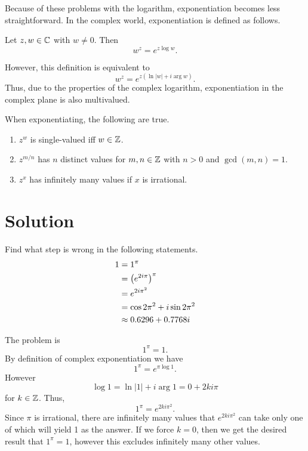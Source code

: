 \documentclass[notitlepage]{problem-solving}
\begin{document}
Because of these problems with the logarithm, exponentiation becomes less straightforward.
In the complex world, exponentiation is defined as follows.
\begin{definition}
	Let $z,w\in\mathbb{C}$ with $w\neq 0$.
	Then
	\[
		w^z = e^{z\log w}.
	\]
\end{definition}
However, this definition is equivalent to
\[
	w^z = e^{z(\ln|w| + i\arg w)}.
\]
Thus, due to the properties of the complex logarithm, exponentiation in the complex plane is also multivalued.

When exponentiating, the following are true.
\begin{enumerate}
	\item $z^w$ is single-valued iff $w\in\mathbb{Z}$.
	\item $z^{m/n}$ has $n$ distinct values for $m,n\in\mathbb{Z}$ with $n>0$ and $\gcd(m,n)=1$.
	\item $z^x$ has infinitely many values if $x$ is irrational.
\end{enumerate}

\section{Solution}

\begin{problem*}
	Find what step is wrong in the following statements.
	\begin{align*}
		1 &= 1^\pi\\
		&= \left( e^{2i\pi} \right)^\pi\\
		&=e^{2i\pi^2}\\
		&=\cos 2\pi^2 + i\sin 2\pi^2\\
		&\approx 0.6296 +0.7768 i
	\end{align*}
\end{problem*}

The problem is
\[
	1^\pi = 1.
\]
By definition of complex exponentiation we have
\[
	1^\pi = e^{\pi\log 1}.
\]
However
\[
	\log 1 = \ln |1| + i\arg 1 = 0 + 2ki\pi
\]
for $k\in\mathbb{Z}$.
Thus,
\[
	1^{\pi} = e^{2ki\pi^2}.
\]
Since $\pi$ is irrational, there are infinitely many values that $e^{2ki\pi^2}$ can take only one of which will yield 1 as the answer.
If we force $k=0$, then we get the desired result that $1^\pi = 1$, however this excludes infinitely many other values.

\printbibliography
\end{document}
